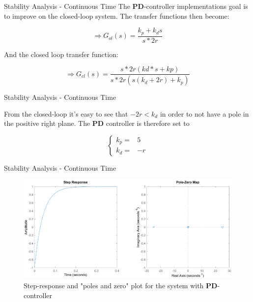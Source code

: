 \documentclass{beamer}
\begin{document}


\begin{frame}{Stability Analysis - Continuous Time}
The \textbf{PD}-controller implementations goal is to improve on the closed-loop system. The transfer functions then become:

\begin{equation}
        \Rightarrow G_{ol}(s) = \frac{k_p + k_d s}{s*2r} 
    \end{equation}
    
    And the closed loop transfer function:
    
    \begin{equation}
         \Rightarrow G_{cl}(s) = \frac{s*2r(kd*s+kp)}{s*2r(s(k_d+2r)+k_p)} 
    \end{equation}
\end{frame}







\begin{frame}{Stability Analysis - Continuous Time}

    From the closed-loop it's easy to see that $-2r<k_d$ in order to not have a pole in the positive right plane. The \textbf{PD} controller is therefore set to
    
    \begin{equation}
         \begin{cases}
             k_p=&5  \\
              k_d=&-r
        \end{cases}  
    \end{equation}
    
\end{frame}






\begin{frame}{Stability Analysis - Continuous Time}

\begin{figure}
    \centering
    \includegraphics[width=1\textwidth]{PD_controller_stab.eps}
    \caption{Step-response and "poles and zero" plot for the system with \textbf{PD}-controller}
\end{figure}

\end{frame}
\end{document}
